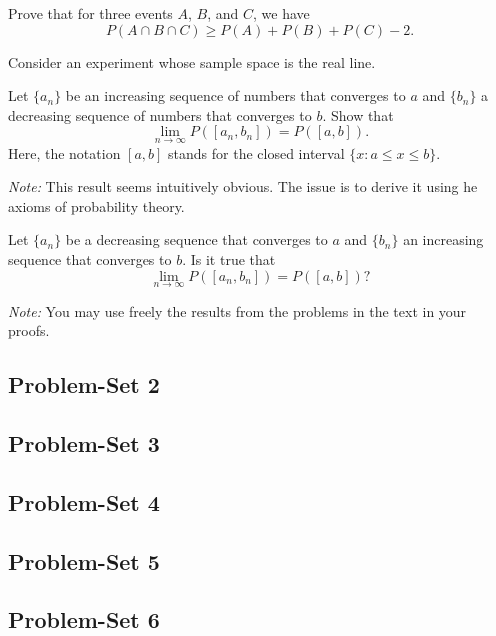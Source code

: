 \begin{problem}
  Prove that for three events \(A\), \(B\), and \(C\), we have
  \[
    P(A\cap B\cap C)\geq P(A)+P(B)+P(C)-2.
  \]
\end{problem}
\begin{solution*}
\end{solution*}

\begin{problem}
  Consider an experiment whose sample space is the real line.
  \begin{alphlist}
  \item Let \(\{a_n\}\) be an increasing sequence of numbers that converges
    to \(a\) and \(\{b_n\}\) a decreasing sequence of numbers that
    converges to \(b\). Show that
    \[
      \lim_{n\to\infty} P([a_n,b_n])=P([a,b]).
    \]
    Here, the notation \([a,b]\) stands for the closed interval \(\{x:a\leq
    x\leq b\}\).

    \noindent\emph{Note:} This result seems intuitively obvious. The issue is to
    derive it using he axioms of probability theory.
  \item Let \(\{a_n\}\) be a decreasing sequence that converges to \(a\)
    and \(\{b_n\}\) an increasing sequence that converges to \(b\). Is it
    true that
    \[
      \lim_{n\to\infty} P([a_n,b_n])=P([a,b])?
    \]

    \noindent\emph{Note:} You may use freely the results from the problems
    in the text in your proofs.
  \end{alphlist}
\end{problem}
\begin{solution*}
\end{solution*}

\subsection{Problem-Set 2}
\subsection{Problem-Set 3}
\subsection{Problem-Set 4}
\subsection{Problem-Set 5}
\subsection{Problem-Set 6}
